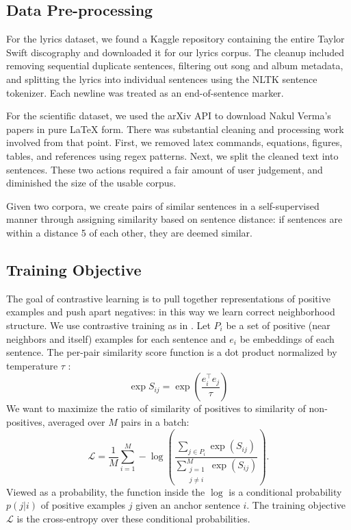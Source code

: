 \documentclass{article}
\begin{document}
\subsection{Data Pre-processing}

For the lyrics dataset, we found a Kaggle repository containing the entire Taylor Swift discography and
downloaded it for our lyrics corpus. The cleanup included removing sequential duplicate sentences, filtering out
song and album metadata, and splitting the lyrics into individual sentences using the NLTK sentence
tokenizer. Each newline was treated as an end-of-sentence marker.

For the scientific dataset, we used the arXiv API to download Nakul Verma's papers in pure LaTeX form. There was
substantial cleaning and processing work involved from that point. First, we removed latex commands,
equations, figures, tables, and references using regex patterns. Next, we split the cleaned text into
sentences. These two actions required a fair amount of user judgement, and diminished the size of the usable corpus.

Given two corpora, we create pairs of similar sentences in a self-supervised manner through assigning
similarity based on sentence distance: if sentences are within a distance 5 of each other, they are deemed similar.

\subsection{Training Objective}
The goal of contrastive learning is to pull together representations of positive examples and push apart
negatives: in this way we learn correct neighborhood structure. We use contrastive training as in
\cite{gao2021simcse}. Let $P_i$ be a set of positive (near neighbors and itself) examples for each sentence
and $e_i$ be embeddings of each sentence. The per-pair similarity score function is a dot product normalized
by temperature $\tau$ :
\[
\exp S_{ij} = \exp\!\left(\frac{e_i^\top e_j}{\tau}\right)
\]
We want to maximize the ratio of similarity of positives to similarity of non-positives, averaged over $M$
pairs in a batch:
\[
\mathcal{L}
=
\frac{1}{M} \sum_{i=1}^{M} - \log\!\left(
\frac{\sum_{j \in P_i} \exp(S_{ij})}{\sum_{\substack{j=1 \\ j\neq i}}^{M} \exp(S_{ij})}
\right).
\]
Viewed as a probability, the function inside the $\log$ is a conditional probability $p(j|i)$ of positive
examples $j$ given an anchor sentence $i$. The training objective $\mathcal{L}$ is the cross-entropy over
these conditional probabilities.
\end{document}
